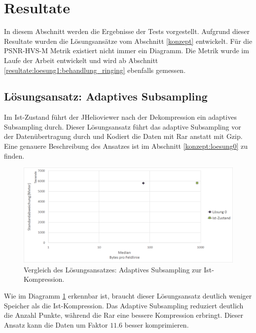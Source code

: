 \section{Resultate}\label{resultate}
In diesem Abschnitt werden die Ergebnisse der Tests vorgestellt. Aufgrund dieser Resultate wurden die Lösungsansätze vom Abschnitt \ref{konzept} entwickelt. Für die PSNR-HVS-M Metrik existiert nicht immer ein Diagramm. Die Metrik wurde im Laufe der Arbeit entwickelt und wird ab Abschnitt \ref{resultate:loesung1:behandlung_ringing} ebenfalls gemessen.

\subsection{Lösungsansatz: Adaptives Subsampling} \label{resultate:loesung0}
Im Ist-Zustand führt der JHelioviewer nach der Dekompression ein adaptives Subsampling durch. Dieser Lösungsansatz führt das adaptive Subsampling vor der Datenübertragung durch und Kodiert die Daten mit Rar anstatt mit Gzip. Eine genauere Beschreibung des Ansatzes ist im Abschnitt \ref{konzept:loesung0} zu finden.
\begin{figure}[!htbp]
	\center
	\includegraphics[width=1\textwidth,keepaspectratio]{./pictures/resultate/loesung0/loesung0_0.png}
	\caption{Vergleich des Lösungsansatzes: Adaptives Subsampling zur Ist-Kompression.}
	\label{resultate:loesung0:loesung0_0}
\end{figure}
Wie im Diagramm \ref{resultate:loesung0:loesung0_0} erkennbar ist, braucht dieser Lösungsansatz deutlich weniger Speicher als die Ist-Kompression. Das Adaptive Subsampling reduziert deutlich die Anzahl Punkte, während die Rar eine bessere Kompression erbringt. Dieser Ansatz kann die Daten um Faktor $11.6$ besser komprimieren.\\
